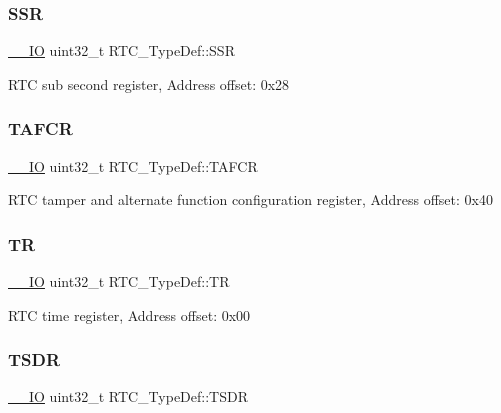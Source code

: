 \subsubsection{\texorpdfstring{S\+SR}{SSR}}
{\footnotesize\ttfamily \hyperlink{core__sc300_8h_aec43007d9998a0a0e01faede4133d6be}{\+\_\+\+\_\+\+IO} uint32\+\_\+t R\+T\+C\+\_\+\+Type\+Def\+::\+S\+SR}

R\+TC sub second register, Address offset\+: 0x28 \mbox{\label{struct_r_t_c___type_def_a498ecce9715c916dd09134fddd0072c0}} 
\subsubsection{\texorpdfstring{T\+A\+F\+CR}{TAFCR}}
{\footnotesize\ttfamily \hyperlink{core__sc300_8h_aec43007d9998a0a0e01faede4133d6be}{\+\_\+\+\_\+\+IO} uint32\+\_\+t R\+T\+C\+\_\+\+Type\+Def\+::\+T\+A\+F\+CR}

R\+TC tamper and alternate function configuration register, Address offset\+: 0x40 \mbox{\label{struct_r_t_c___type_def_a2e8783857f8644a4eb80ebc51e1cba42}} 
\subsubsection{\texorpdfstring{TR}{TR}}
{\footnotesize\ttfamily \hyperlink{core__sc300_8h_aec43007d9998a0a0e01faede4133d6be}{\+\_\+\+\_\+\+IO} uint32\+\_\+t R\+T\+C\+\_\+\+Type\+Def\+::\+TR}

R\+TC time register, Address offset\+: 0x00 \mbox{\label{struct_r_t_c___type_def_aa4633dbcdb5dd41a714020903fd67c82}} 
\subsubsection{\texorpdfstring{T\+S\+DR}{TSDR}}
{\footnotesize\ttfamily \hyperlink{core__sc300_8h_aec43007d9998a0a0e01faede4133d6be}{\+\_\+\+\_\+\+IO} uint32\+\_\+t R\+T\+C\+\_\+\+Type\+Def\+::\+T\+S\+DR}

